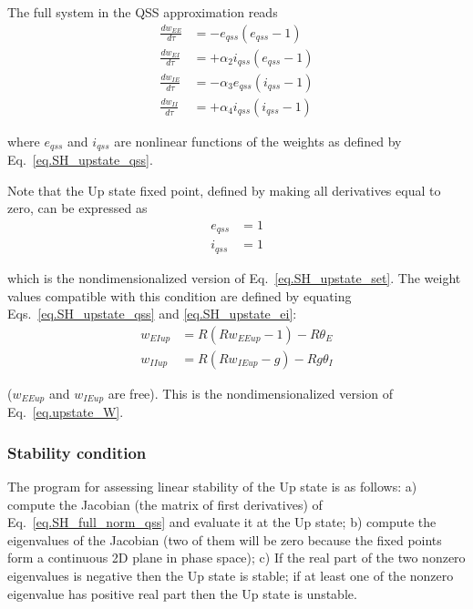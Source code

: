 \documentclass[
twocolumn,
]{article}
\newcommand{\EE}{\mathit{EE}}
\newcommand{\EI}{\mathit{EI}}
\newcommand{\IE}{\mathit{IE}}
\newcommand{\II}{\mathit{II}}
\newcommand{\up}{\mathit{up}}
\newcommand{\qss}{\mathit{qss}}
\begin{document}
The full system in the QSS approximation reads
\begin{equation}
\begin{aligned}
\frac{dw_{\EE}}{d\tau} & = -e_{\qss}(e_{\qss}-1) \\
\frac{dw_{\EI}}{d\tau} & = +\alpha_2 i_{\qss}(e_{\qss}-1) \\
\frac{dw_{\IE}}{d\tau} & = -\alpha_3 e_{\qss}(i_{\qss}-1) \\
\frac{dw_{\II}}{d\tau} & = +\alpha_4 i_{\qss}(i_{\qss}-1)
\end{aligned}
\label{eq.SH_full_norm_qss}
\end{equation}

\noindent where $e_{\qss}$ and $i_{\qss}$ are nonlinear functions of the weights as defined by Eq.\ \ref{eq.SH_upstate_qss}.

Note that the Up state fixed point, defined by making all derivatives equal to zero, can be expressed as
\begin{equation}
\begin{aligned}
e_{\qss} & = 1 \\
i_{\qss} & = 1
\end{aligned}
\label{eq.SH_upstate_ei}
\end{equation}

\noindent which is the nondimensionalized version of Eq.\ \ref{eq.SH_upstate_set}. The weight values compatible with this condition are defined by equating Eqs.\ \ref{eq.SH_upstate_qss} and \ref{eq.SH_upstate_ei}:
\begin{equation}
\begin{aligned}
w_{\EI\up} & = R (Rw_{\EE\up} - 1) - R \theta_E \\
w_{\II\up} & = R (Rw_{\IE\up} - g) - Rg \theta_I
\end{aligned}
\label{eq.SH_upstate_w}
\end{equation}

\noindent ($w_{\EE\up}$ and $w_{\IE\up}$ are free). This is the nondimensionalized version of Eq.\ \ref{eq.upstate_W}.


\subsubsection{Stability condition}

The program for assessing linear stability of the Up state is as follows: a) compute the Jacobian (the matrix of first derivatives) of Eq.\ \ref{eq.SH_full_norm_qss} and evaluate it at the Up state; b) compute the eigenvalues of the Jacobian (two of them will be zero because the fixed points form a continuous 2D plane in phase space); c) If the real part of the two nonzero eigenvalues is negative then the Up state is stable; if at least one of the nonzero eigenvalue has positive real part then the Up state is unstable.
\end{document}
